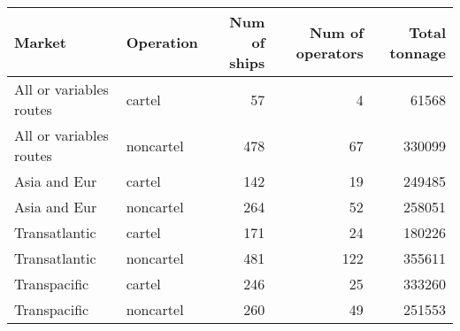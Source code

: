 
\begin{tabular}[t]{llrrr}
\toprule
Market & Operation & Num of ships & Num of operators & Total tonnage\\
\midrule
All or variables routes & cartel & 57 & 4 & 61568\\
All or variables routes & noncartel & 478 & 67 & 330099\\
Asia and Eur & cartel & 142 & 19 & 249485\\
Asia and Eur & noncartel & 264 & 52 & 258051\\
Transatlantic & cartel & 171 & 24 & 180226\\
\addlinespace
Transatlantic & noncartel & 481 & 122 & 355611\\
Transpacific & cartel & 246 & 25 & 333260\\
Transpacific & noncartel & 260 & 49 & 251553\\
\bottomrule
\end{tabular}
